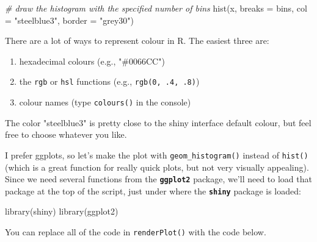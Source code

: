 \documentclass[
  oneside]{book}
\newenvironment{Shaded}{\begin{snugshade}}{\end{snugshade}}
\newcommand{\AttributeTok}[1]{\textcolor[rgb]{0.77,0.63,0.00}{#1}}
\newcommand{\CommentTok}[1]{\textcolor[rgb]{0.56,0.35,0.01}{\textit{#1}}}
\newcommand{\FunctionTok}[1]{\textcolor[rgb]{0.00,0.00,0.00}{#1}}
\newcommand{\NormalTok}[1]{#1}
\newcommand{\OtherTok}[1]{\textcolor[rgb]{0.56,0.35,0.01}{#1}}
\newcommand{\SpecialCharTok}[1]{\textcolor[rgb]{0.00,0.00,0.00}{#1}}
\newcommand{\StringTok}[1]{\textcolor[rgb]{0.31,0.60,0.02}{#1}}
\providecommand{\tightlist}{%
  \setlength{\itemsep}{0pt}\setlength{\parskip}{0pt}}
\begin{document}
\begin{Shaded}
\begin{Highlighting}[]
\CommentTok{\# draw the histogram with the specified number of bins}
\FunctionTok{hist}\NormalTok{(x, }\AttributeTok{breaks =}\NormalTok{ bins, }\AttributeTok{col =} \StringTok{"steelblue3"}\NormalTok{, }\AttributeTok{border =} \StringTok{"grey30"}\NormalTok{)}
\end{Highlighting}
\end{Shaded}

There are a lot of ways to represent colour in R. The easiest three are:

\begin{enumerate}
\def\labelenumi{\arabic{enumi}.}
\tightlist
\item
  hexadecimal colours (e.g., \StringTok{"\#0066CC"})
\item
  the \texttt{rgb} or \texttt{hsl} functions (e.g., \texttt{rgb(0,\ .4,\ .8)})
\item
  colour names (type \texttt{colours}\texttt{()} in the console)
\end{enumerate}

The color \StringTok{"steelblue3"} is pretty close to the shiny interface default colour, but feel free to choose whatever you like.

I prefer ggplots, so let's make the plot with \texttt{geom\_histogram}\texttt{()} instead of \texttt{hist}\texttt{()} (which is a great function for really quick plots, but not very visually appealing). Since we need several functions from the \textbf{\texttt{ggplot2}} package, we'll need to load that package at the top of the script, just under where the \textbf{\texttt{shiny}} package is loaded:

\begin{Shaded}
\begin{Highlighting}[]
\FunctionTok{library}\NormalTok{(shiny)}
\FunctionTok{library}\NormalTok{(ggplot2)}
\end{Highlighting}
\end{Shaded}

You can replace all of the code in \texttt{renderPlot}\texttt{()} with the code below.

\begin{Shaded}
\end{Shaded}
\end{document}
